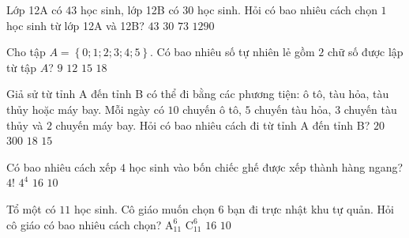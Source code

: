 \begin{ex}%
	Lớp 12A có $43$ học sinh, lớp 12B có $30$ học sinh. Hỏi có bao nhiêu cách chọn $1$ học sinh từ lớp 12A và 12B?
	\choice
	{$43$}
	{$30$}
	{\True $73$}
	{$1290$}
\end{ex}
\begin{ex}%
	Cho tập $A=\left\{0;1;2;3;4;5\right\}$. Có bao nhiêu số tự nhiên lẻ gồm $2$ chữ số được lập từ tập $A$?
	\choice
	{$9$}
	{$12$}
	{\True $15$}
	{$18$}
\end{ex}
\begin{ex}%
	Giả sử từ tỉnh A đến tỉnh B có thể đi bằng các phương tiện: ô tô, tàu hỏa, tàu thủy hoặc máy bay.
	Mỗi ngày có $10$ chuyến ô tô, $5$ chuyến tàu hỏa, $3$ chuyến tàu thủy và $2$ chuyến máy bay. Hỏi có bao nhiêu cách đi từ tỉnh A đến tỉnh B?
	\choice
	{$20$}
	{$300$}
	{\True $18$}
	{$15$}
\end{ex}
\begin{ex}%
	 Có bao nhiêu cách xếp $4$ học sinh vào bốn chiếc ghế được xếp thành hàng ngang?
	\choice
	{\True $4!$}
	{$4^4$}
	{$16$}
	{$10$}
\end{ex}
\begin{ex}%
	Tổ một có $11$ học sinh. Cô giáo muốn chọn $6$ bạn đi trực nhật khu tự quản. Hỏi cô giáo có bao nhiêu cách chọn?
	\choice
	{$\mathrm{A}_{11}^6$}
	{\True $\mathrm{C}_{11}^6$}
	{$16$}
	{$10$}
\end{ex}
